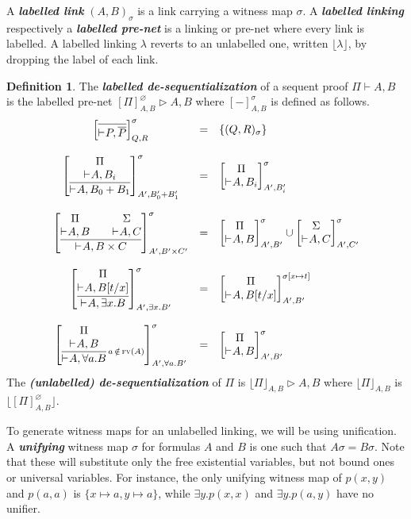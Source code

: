 \documentclass{article}
\theoremstyle{definition}
\newtheorem{definition}{Definition}
\theoremstyle{plain}
\newcommand\defn[1]{\textit{\textbf{#1}}}
\newcommand\floor[1]{\lfloor#1\rfloor}
\newcommand\+{+}
\renewcommand\*{\times}
\newcommand\dual[1]{\overline{#1}}
\newcommand\seq[3][]{{\vdash_{#1}}#2,#3}
\newcommand\prf[3]{#1\vdash\!#2,#3}
\newcommand\net[3]{#1\triangleright #2,#3}
\newcommand\deseq[4][\sigma]{[#2]^{#1}_{#3,#4}}
\newcommand\Deseq[4][\sigma]{\left[\vcenter{#2}\right]^{#1}_{#3,#4}}
\newcommand\clink[3][\sigma]{(#2,#3)_{#1}}
\begin{document}
A \defn{labelled link} $\clink AB$ is a link carrying a witness map $\sigma$. A \defn{labelled linking} respectively a \defn{labelled pre-net} is a linking or pre-net where every link is labelled. A labelled linking $\lambda$ reverts to an unlabelled one, written $\floor\lambda$, by dropping the label of each link. 

\begin{definition}
The \defn{labelled de-sequentialization} of a sequent proof $\prf\Pi AB$ is the labelled pre-net $\net{\deseq[\varnothing]\Pi AB} AB$ where $\deseq-AB$ is defined as follows.
%
\[
\begin{array}{ccl}
	\Deseq{\infer{\seq P{\dual P}}{}}QR &=& \{\clink QR\}
\\ \\
	\Deseq{\infer {\seq A {B_0\+B_1}} {\deduce [\rule{0pt}{1pt}] {\seq A{B_i}} \Pi }}
	  {A'}{B_0'\+B'_1} 
	&=& \Deseq{\deduce[\rule{0pt}{1pt}]{\seq A{B_i}}\Pi}{A'}{B_i'}
\\ \\
	\Deseq{\infer{\seq A{B\*C}}{
	  \deduce[\rule{0pt}{1pt}]{\seq AB}\Pi 
	  && 
	  \deduce[\rule{0pt}{1pt}]{\seq AC}\Sigma}}{A'}{B'\*C'}
	&=& \Deseq{\deduce[\rule{0pt}{1pt}]{\seq AB}\Pi}{A'}{B'}
	  \cup
	  \Deseq{\deduce[\rule{0pt}{1pt}]{\seq AC}\Sigma}{A'}{C'}
\\ \\
	\Deseq{\infer{\seq A{\exists x.B}}{\deduce[\rule{0pt}{1pt}]{\seq A{B[t/x]}}\Pi}}
	  {A'}{\exists x.B'}
	&=&
	 \Deseq[{\sigma[x\mapsto t]}]{\deduce[\rule{0pt}{1pt}]{\seq A{B[t/x]}}\Pi}
	  {A'}{B'}
\\ \\
	\Deseq{\infer[\!\!\scriptstyle{a\,\notin\,\textsc{fv}(A)}]
	  {\seq A{\forall a.B}}{\deduce[\rule{0pt}{1pt}]{\seq AB}\Pi}}{A'}{\forall a.B'}
	&=&
	  \Deseq{\deduce[\rule{0pt}{1pt}]{\seq AB}\Pi}{A'}{B'}
\end{array}
\]
The \defn{(unlabelled) de-sequentialization} of $\Pi$ is $\net{\floor\Pi_{A,B}}AB$ where $\floor\Pi_{A,B}$ is $\floor{\deseq[\varnothing]\Pi AB}$.
\end{definition}


To generate witness maps for an unlabelled linking, we will be using unification. A \defn{unifying} witness map $\sigma$ for formulas $A$ and $B$ is one such that $A\sigma=B\sigma$. Note that these will substitute only the free existential variables, but not bound ones or universal variables. For instance, the only unifying witness map of $p(x,y)$ and $p(a,a)$ is $\{x\mapsto a,y\mapsto a\}$, while $\exists y.p(x,x)$ and $\exists y.p(a,y)$ have no unifier.
\end{document}
